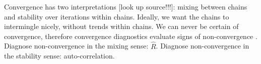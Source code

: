 \documentclass[article]{jss}
\begin{document}
Convergence has two interpretations [look up source!!!]: mixing between chains and stability over iterations within chains. Ideally, we want the chains to intermingle nicely, without trends within chains. 
We can never be certain of convergence, therefore convergence diagnostics evaluate signs of non-convergence \citep{hoff09}. %
Diagnose non-convergence in the mixing sense: $\widehat{R}$. Diagnose non-convergence in the stability sense: auto-correlation. 
\end{document}
